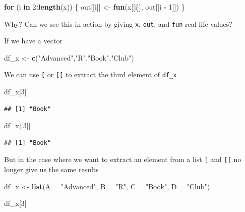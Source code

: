 \documentclass[]{book}
\newenvironment{Shaded}{\begin{snugshade}}{\end{snugshade}}
\newcommand{\ControlFlowTok}[1]{\textcolor[rgb]{0.13,0.29,0.53}{\textbf{#1}}}
\newcommand{\DataTypeTok}[1]{\textcolor[rgb]{0.13,0.29,0.53}{#1}}
\newcommand{\DecValTok}[1]{\textcolor[rgb]{0.00,0.00,0.81}{#1}}
\newcommand{\KeywordTok}[1]{\textcolor[rgb]{0.13,0.29,0.53}{\textbf{#1}}}
\newcommand{\NormalTok}[1]{#1}
\newcommand{\OperatorTok}[1]{\textcolor[rgb]{0.81,0.36,0.00}{\textbf{#1}}}
\newcommand{\StringTok}[1]{\textcolor[rgb]{0.31,0.60,0.02}{#1}}
\begin{document}
\begin{Shaded}
\begin{Highlighting}[]
\ControlFlowTok{for}\NormalTok{ (i }\ControlFlowTok{in} \DecValTok{2}\OperatorTok{:}\KeywordTok{length}\NormalTok{(x)) \{}
\NormalTok{  out[[i]] <-}\StringTok{ }\KeywordTok{fun}\NormalTok{(x[[i]], out[[i }\OperatorTok{-}\StringTok{ }\DecValTok{1}\NormalTok{]])}
\NormalTok{\}}
\end{Highlighting}
\end{Shaded}

Why? Can we see this in action by giving \texttt{x}, \texttt{out}, and \texttt{fun} real life values?

If we have a vector

\begin{Shaded}
\begin{Highlighting}[]
\NormalTok{df_x <-}\StringTok{ }\KeywordTok{c}\NormalTok{(}\StringTok{"Advanced"}\NormalTok{,}\StringTok{"R"}\NormalTok{,}\StringTok{"Book"}\NormalTok{,}\StringTok{"Club"}\NormalTok{)}
\end{Highlighting}
\end{Shaded}

We can use \texttt{{[}} or \texttt{{[}{[}} to extract the third element of \texttt{df\_x}

\begin{Shaded}
\begin{Highlighting}[]
\NormalTok{df_x[}\DecValTok{3}\NormalTok{]}
\end{Highlighting}
\end{Shaded}

\begin{verbatim}
## [1] "Book"
\end{verbatim}

\begin{Shaded}
\begin{Highlighting}[]
\NormalTok{df_x[[}\DecValTok{3}\NormalTok{]]}
\end{Highlighting}
\end{Shaded}

\begin{verbatim}
## [1] "Book"
\end{verbatim}

But in the case where we want to extract an element from a list \texttt{{[}} and \texttt{{[}{[}} no longer give us the same results

\begin{Shaded}
\begin{Highlighting}[]
\NormalTok{df_x <-}\StringTok{ }\KeywordTok{list}\NormalTok{(}\DataTypeTok{A =} \StringTok{"Advanced"}\NormalTok{, }\DataTypeTok{B =} \StringTok{"R"}\NormalTok{, }\DataTypeTok{C =} \StringTok{"Book"}\NormalTok{, }\DataTypeTok{D =} \StringTok{"Club"}\NormalTok{)}

\NormalTok{df_x[}\DecValTok{3}\NormalTok{]}
\end{Highlighting}
\end{Shaded}
\end{document}
